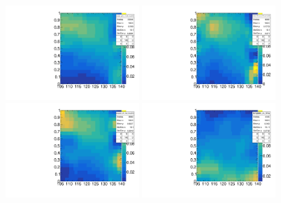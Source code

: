 \begin{figure}[!htb]
\vspace*{0.3cm}
\begin{center}
\includegraphics[width=0.45\textwidth]{Figures/Observables/template_ggH_0j_10_200_4mu2018template.pdf}%
\includegraphics[width=0.45\textwidth]{Figures/Observables/template_VBF_2j_mjj_GT700_2j_4mu2018template.pdf}\\%
\includegraphics[width=0.45\textwidth]{Figures/Observables/template_VH_Had_4mu2018template.pdf}%
\includegraphics[width=0.45\textwidth]{Figures/Observables/zx_4mu2018template.pdf}\\%

\end{center}
\end{figure}
